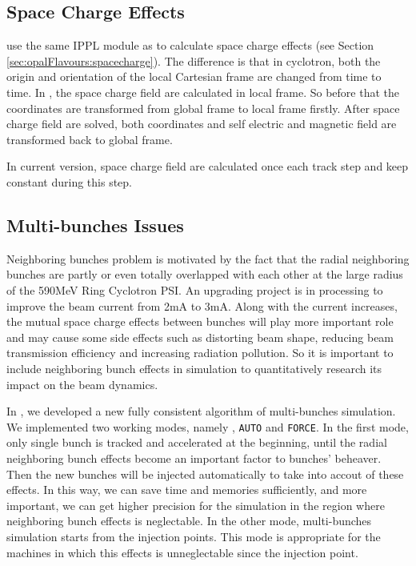 \subsection{Space Charge Effects}  

\opalcycl use the same IPPL module as \opalt to calculate space charge effects (see Section \ref{sec:opalFlavours:spacecharge}).
The difference is that in cyclotron,
both the origin and orientation of the local Cartesian frame are changed from time to time. In \opalcycl, the space charge field
are calculated in local frame. So before that the coordinates are transformed from global frame to local frame firstly.
After space charge field are solved, both coordinates and self electric and magnetic field are transformed back to global frame.
 
In current version, space charge field are calculated once each track step and keep constant during this step.      

\subsection{Multi-bunches Issues}
\label{sec:opalcycl:MultiBunch}
				   
Neighboring bunches problem is motivated by the fact that the radial neighboring bunches are partly or even totally overlapped with each
other at the large radius of the 590MeV Ring Cyclotron PSI. An upgrading project is in processing to improve the beam current from 2mA
to 3mA. Along with the current increases, the mutual space charge effects between bunches will play more important role and may cause
some side effects such as distorting beam shape, reducing beam transmission efficiency and increasing radiation pollution. So it is important to
include neighboring bunch effects in simulation to quantitatively research its impact on the beam dynamics.

In \opalcycl, we developed a new fully consistent algorithm of multi-bunches simulation.  We implemented two working modes, namely , 
\texttt{AUTO} and \texttt{FORCE}. In the first mode, only single bunch is tracked and accelerated at the beginning,
until the radial neighboring bunch effects become an important factor to bunches' beheaver. Then the new bunches will be injected automatically to 
take into accout of these effects. In this way, we can save time and memories sufficiently, and more important, 
we can get higher precision for the simulation in the region where neighboring bunch effects is neglectable.
In the other mode, multi-bunches simulation starts from the injection points. This mode is appropriate for the machines in which this effects is 
unneglectable since the injection point.    

